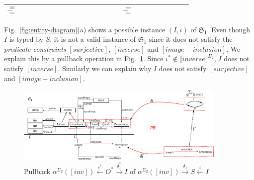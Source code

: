 \documentclass{eceasst}
\begin{document}
\begin{table}[h]
\begin{center}
\begin{tabular}{| l | c | c | c | c | }
				    \includegraphics[width=0.10\textwidth]{inheritance2-L-delta.pdf} & \includegraphics[width=0.10\textwidth]{inheritance2-R-delta.pdf} \\ 				    
    \hline    
    \end{tabular}
    \end{center}
\end{table}
\normalsize

Fig.~\ref{fig:entity-diagram}(a) shows a possible instance $(I, \iota)$ of $\mathfrak{S}_1$. 
Even though $I$ is typed by $S$, it is not a valid instance of $\mathfrak{S}_1$ since it does not satisfy the \textit{predicate constraints} $[surjective]$, $[inverse]$ and $[image-inclusion]$. 
We explain this by a pullback operation in Fig.~\ref{fig:entity-pb}. Since $\iota^* \notin \llbracket inverse \rrbracket^{\Sigma_2}$, $I$ does not satisfy $[inverse]$. 
Similarly we can explain why $I$ does not satisfy $[surjective]$ and $[image-inclusion]$. 


\begin{figure}[h]
\centering
 \includegraphics[width=0.9\textwidth]{entity-1-pullback.pdf}
 \caption{ Pullback $\alpha^{\Sigma_2}([inv]) \xleftarrow{\iota^*} O^* \xrightarrow{\delta_1^*} I $ of $\alpha^{\Sigma_2}([inv]) \xrightarrow{\delta_1} S \xleftarrow{\iota} I $ }
 \label{fig:entity-pb}
 \end{figure}
 
\end{document}
